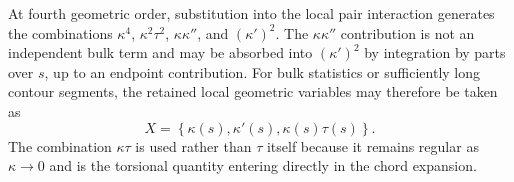 \documentclass[11pt]{article}
\begin{document}
At fourth geometric order, substitution into the local pair interaction generates the combinations \(\kappa^4\), \(\kappa^2\tau^2\), \(\kappa\kappa''\), and \((\kappa')^2\). The \(\kappa\kappa''\) contribution is not an independent bulk term and may be absorbed into \((\kappa')^2\) by integration by parts over \(s\), up to an endpoint contribution. For bulk statistics or sufficiently long contour segments, the retained local geometric variables may therefore be taken as
\begin{equation}
X=
\left\{
\kappa(s),\kappa'(s),\kappa(s)\tau(s)
\right\}.
\end{equation}
The combination \(\kappa\tau\) is used rather than \(\tau\) itself because it remains regular as \(\kappa\rightarrow0\) and is the torsional quantity entering directly in the chord expansion.
\end{document}
